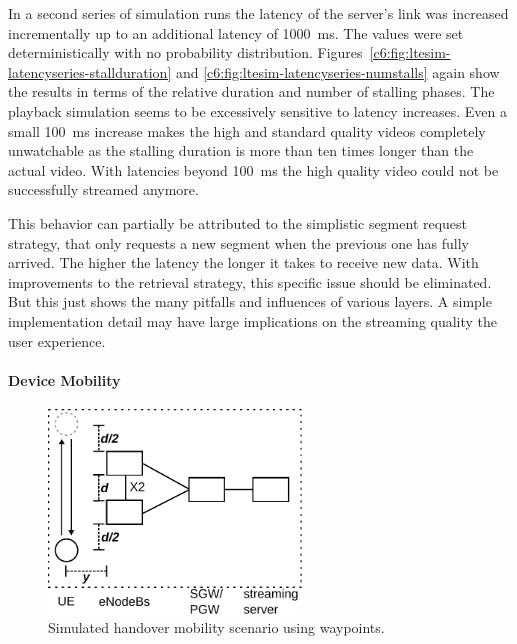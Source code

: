 In a second series of simulation runs the latency of the server's link was increased incrementally up to an additional latency of \SI{1000}{\milli\second}. The values were set deterministically with no probability distribution. Figures~\ref{c6:fig:ltesim-latencyseries-stallduration} and \ref{c6:fig:ltesim-latencyseries-numstalls} again show the results in terms of the relative duration and number of stalling phases. The playback simulation seems to be excessively sensitive to latency increases. Even a small \SI{100}{\milli\second} increase makes the high and standard quality videos completely unwatchable as the stalling duration is more than ten times longer than the actual video. With latencies beyond \SI{100}{\milli\second} the high quality video could not be successfully streamed anymore. 

This behavior can partially be attributed to the simplistic segment request strategy, that only requests a new segment when the previous one has fully arrived. The higher the latency the longer it takes to receive new data. With improvements to the retrieval strategy, this specific issue should be eliminated. But this just shows the many pitfalls and influences of various layers. A simple implementation detail may have large implications on the streaming quality the user experience.



\paragraph{Device Mobility}

\begin{figure}[htb]
	\centering
	\includegraphics[width=0.6\textwidth]{images/streaming-simulation-mobility.pdf}
	\caption{Simulated handover mobility scenario using waypoints.}
\label{c6:fig:streaming-simulation-mobility}
\end{figure}

